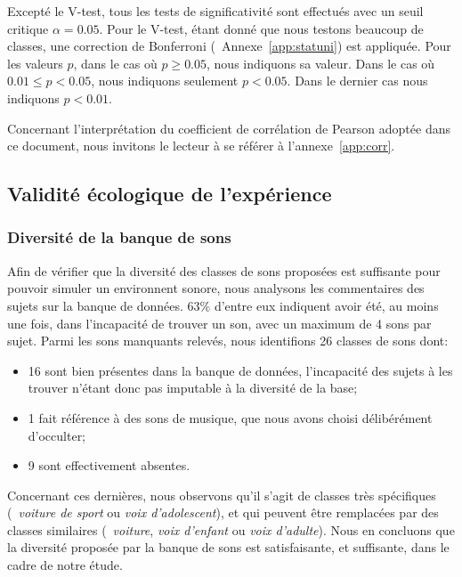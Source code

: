 Excepté le V-test, tous les tests de significativité sont effectués avec un seuil critique $\alpha=0.05$. Pour le V-test, étant donné que nous testons beaucoup de classes, une correction de Bonferroni (\cf~Annexe~\ref{app:statuni}) est appliquée. Pour les valeurs $p$, dans le cas où $p\geq0.05$, nous indiquons sa valeur. Dans le cas où $0.01\leq p<0.05$, nous indiquons seulement $p<0.05$. Dans le dernier cas nous indiquons $p<0.01$.

Concernant l'interprétation du coefficient de corrélation de Pearson adoptée dans ce document, nous invitons le lecteur à se référer à l'annexe~\ref{app:corr}.

\subsection{Validité écologique de l'expérience}

\subsubsection{Diversité de la banque de sons}

Afin de vérifier que la diversité des classes de sons proposées est suffisante pour pouvoir simuler un environnent sonore, nous analysons les commentaires des sujets sur la banque de données. 63\% d'entre eux indiquent avoir été, au moins une fois, dans l'incapacité de trouver un son, avec un maximum de 4 sons par sujet. Parmi les sons manquants relevés, nous identifions 26 classes de sons dont:

\begin{itemize}
\item 16 sont bien présentes dans la banque de données, l'incapacité des sujets à les trouver n'étant donc pas imputable à la diversité de la base;
\item 1 fait référence à des sons de musique, que nous avons choisi délibérément d'occulter;
\item 9 sont effectivement absentes.  
\end{itemize}

Concernant ces dernières, nous observons qu'il s'agit de classes très spécifiques (\eg~\emph{voiture de sport} ou \emph{voix d'adolescent}), et qui peuvent être remplacées par des classes similaires (\eg~\emph{voiture}, \emph{voix d'enfant} ou \emph{voix d'adulte}). Nous en concluons que la diversité proposée par la banque de sons est satisfaisante, et suffisante, dans le cadre de notre étude.

